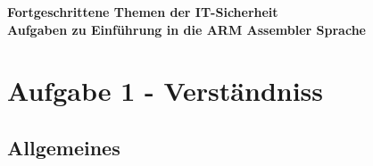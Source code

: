 \documentclass[12pt]{article}
\begin{document}
\begin{center}
  \textbf{\LARGE Fortgeschrittene Themen der IT-Sicherheit} \\[1ex]%
  \textbf{\Large Aufgaben zu Einführung in die ARM Assembler Sprache}\\[2ex] %
  
\end{center}

\section{Aufgabe 1 - Verständniss}

\subsection{Allgemeines}
\end{document}
